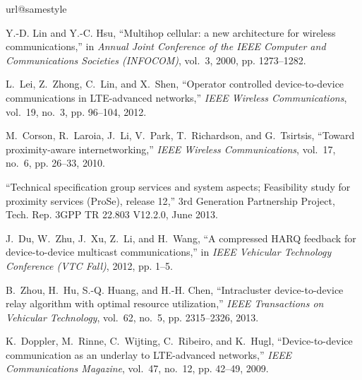 \documentclass[twocolumn,10pt]{IEEEtran}
\begin{document}
\begin{thebibliography}{10}
\providecommand{\url}[1]{#1}
\csname url@samestyle\endcsname
\providecommand{\newblock}{\relax}
\providecommand{\bibinfo}[2]{#2}
\providecommand{\BIBentrySTDinterwordspacing}{\spaceskip=0pt\relax}
\providecommand{\BIBentryALTinterwordstretchfactor}{4}
\providecommand{\BIBentryALTinterwordspacing}{\spaceskip=\fontdimen2\font plus
\BIBentryALTinterwordstretchfactor\fontdimen3\font minus
  \fontdimen4\font\relax}
\providecommand{\BIBforeignlanguage}[2]{{\expandafter\ifx\csname l@#1\endcsname\relax
\typeout{** WARNING: IEEEtran.bst: No hyphenation pattern has been}\typeout{** loaded for the language `#1'. Using the pattern for}\typeout{** the default language instead.}\else
\language=\csname l@#1\endcsname
\fi
#2}}
\providecommand{\BIBdecl}{\relax}
\BIBdecl

Y.-D. Lin and Y.-C. Hsu, ``Multihop cellular: a new architecture for wireless
  communications,'' in \emph{Annual Joint Conference of the IEEE Computer and
  Communications Societies (INFOCOM)}, vol.~3, 2000, pp. 1273--1282.

L.~Lei, Z.~Zhong, C.~Lin, and X.~Shen, ``{Operator controlled device-to-device
  communications in LTE-advanced networks},'' \emph{IEEE Wireless
  Communications}, vol.~19, no.~3, pp. 96--104, 2012.

M.~Corson, R.~Laroia, J.~Li, V.~Park, T.~Richardson, and G.~Tsirtsis, ``Toward
  proximity-aware internetworking,'' \emph{IEEE Wireless Communications},
  vol.~17, no.~6, pp. 26--33, 2010.

``{Technical specification group services and system aspects; Feasibility study
  for proximity services (ProSe), release 12},'' 3rd Generation Partnership
  Project, Tech. Rep. 3GPP TR 22.803 V12.2.0, June 2013.

J.~Du, W.~Zhu, J.~Xu, Z.~Li, and H.~Wang, ``{A compressed HARQ feedback for
  device-to-device multicast communications},'' in \emph{IEEE Vehicular
  Technology Conference (VTC Fall)}, 2012, pp. 1--5.

B.~Zhou, H.~Hu, S.-Q. Huang, and H.-H. Chen, ``Intracluster device-to-device
  relay algorithm with optimal resource utilization,'' \emph{IEEE Transactions
  on Vehicular Technology}, vol.~62, no.~5, pp. 2315--2326, 2013.

K.~Doppler, M.~Rinne, C.~Wijting, C.~Ribeiro, and K.~Hugl, ``{Device-to-device
  communication as an underlay to LTE-advanced networks},'' \emph{IEEE
  Communications Magazine}, vol.~47, no.~12, pp. 42--49, 2009.


\end{thebibliography}
\end{document}

